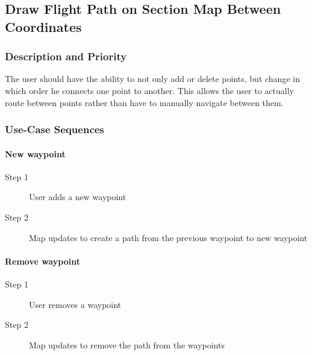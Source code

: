 \documentclass[12pt, letterpaper]{article}
\begin{document}
      \subsection{Draw Flight Path on Section Map Between Coordinates}
        \subsubsection{Description and Priority}
        		The user should have the ability to not only add or delete points, but change in which
        		order he connects one point to another. This allows the user to actually route between
            points rather than have to manually navigate between them.
        \subsubsection{Use-Case Sequences}
        \paragraph{New waypoint}
          \begin{description}

            \item[Step 1] User adds a new waypoint \\
            \item[Step 2] Map updates to create a path from the previous waypoint to new waypoint\\
          \end{description}
              \paragraph{Remove waypoint}
              \begin{description}
                \item[Step 1] User removes a waypoint\\
            \item[Step 2] Map updates to remove the path from the waypoints\\
          \end{description}
\end{document}
